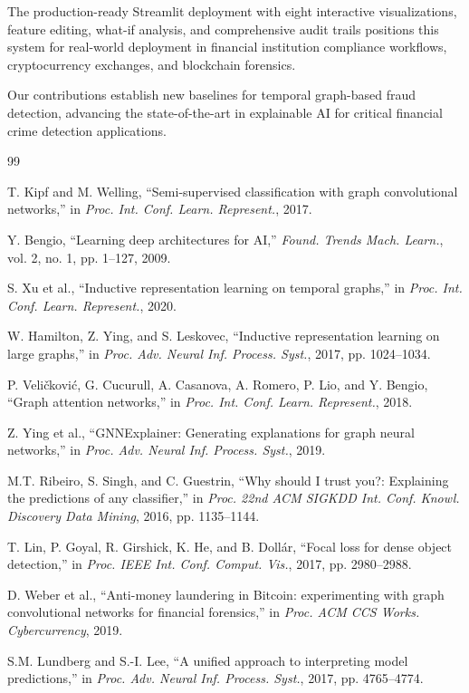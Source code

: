 \documentclass[10pt,conference,compsociety]{IEEEtran}
\begin{document}
The production-ready Streamlit deployment with eight interactive visualizations, feature editing, what-if analysis, and comprehensive audit trails positions this system for real-world deployment in financial institution compliance workflows, cryptocurrency exchanges, and blockchain forensics.

Our contributions establish new baselines for temporal graph-based fraud detection, advancing the state-of-the-art in explainable AI for critical financial crime detection applications.

\begin{thebibliography}{99}

T. Kipf and M. Welling, ``Semi-supervised classification with graph convolutional networks,'' in \textit{Proc. Int. Conf. Learn. Represent.}, 2017.

Y. Bengio, ``Learning deep architectures for AI,'' \textit{Found. Trends Mach. Learn.}, vol. 2, no. 1, pp. 1–127, 2009.

S. Xu et al., ``Inductive representation learning on temporal graphs,'' in \textit{Proc. Int. Conf. Learn. Represent.}, 2020.

W. Hamilton, Z. Ying, and S. Leskovec, ``Inductive representation learning on large graphs,'' in \textit{Proc. Adv. Neural Inf. Process. Syst.}, 2017, pp. 1024--1034.

P. Veličković, G. Cucurull, A. Casanova, A. Romero, P. Lio, and Y. Bengio, ``Graph attention networks,'' in \textit{Proc. Int. Conf. Learn. Represent.}, 2018.

Z. Ying et al., ``GNNExplainer: Generating explanations for graph neural networks,'' in \textit{Proc. Adv. Neural Inf. Process. Syst.}, 2019.

M.T. Ribeiro, S. Singh, and C. Guestrin, ``Why should I trust you?: Explaining the predictions of any classifier,'' in \textit{Proc. 22nd ACM SIGKDD Int. Conf. Knowl. Discovery Data Mining}, 2016, pp. 1135--1144.

T. Lin, P. Goyal, R. Girshick, K. He, and B. Dollár, ``Focal loss for dense object detection,'' in \textit{Proc. IEEE Int. Conf. Comput. Vis.}, 2017, pp. 2980--2988.

D. Weber et al., ``Anti-money laundering in Bitcoin: experimenting with graph convolutional networks for financial forensics,'' in \textit{Proc. ACM CCS Works. Cybercurrency}, 2019.

S.M. Lundberg and S.-I. Lee, ``A unified approach to interpreting model predictions,'' in \textit{Proc. Adv. Neural Inf. Process. Syst.}, 2017, pp. 4765--4774.

\end{thebibliography}
\end{document}
